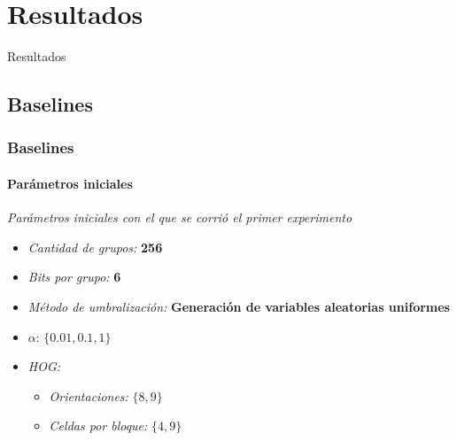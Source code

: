 \section{Resultados}
	\begin{frame}
		\begin{center}
			\begin{huge}
				{Resultados}
			\end{huge}
		\end{center}
	\end{frame}
	\subsection{Baselines}
		\begin{frame}
				\frametitle{Baselines}
				\framesubtitle{Parámetros iniciales}
				\textit{Parámetros iniciales con el que se corrió el primer experimento}
				\begin{itemize}
					\item<1-> \textit{Cantidad de grupos:} \textbf{256}
					\item<2-> \textit{Bits por grupo:} \textbf{6}
					\item<3-> \textit{Método de umbralización:} \textbf{Generación de variables aleatorias uniformes}
					\item<4-> $\alpha$: $\{0.01, 0.1, 1\}$
					\item<5-> \textit{HOG:}
						\begin{itemize}
							\item<6-> \textit{Orientaciones:} $\{8, 9\}$
							\item<7-> \textit{Celdas por bloque:} $\{4, 9\}$
						\end{itemize}
				\end{itemize}
		\end{frame}
